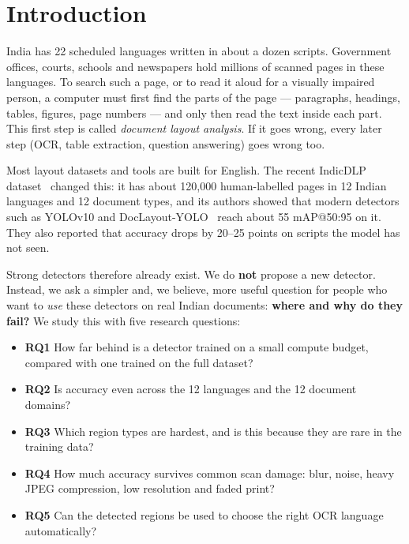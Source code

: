 \section{Introduction}
India has 22 scheduled languages written in about a dozen scripts. Government offices, courts, schools and
newspapers hold millions of scanned pages in these languages. To search such a page, or to read it aloud for a
visually impaired person, a computer must first find the parts of the page --- paragraphs, headings, tables,
figures, page numbers --- and only then read the text inside each part. This first step is called
\emph{document layout analysis}. If it goes wrong, every later step (OCR, table extraction, question answering)
goes wrong too.

Most layout datasets and tools are built for English. The recent IndicDLP dataset~\cite{indicdlp} changed this: it
has about 120{,}000 human-labelled pages in 12 Indian languages and 12 document types, and its authors showed that
modern detectors such as YOLOv10 and DocLayout-YOLO~\cite{doclayout} reach about 55 mAP@50:95 on it. They also
reported that accuracy drops by 20--25 points on scripts the model has not seen.

Strong detectors therefore already exist. We do \textbf{not} propose a new detector. Instead, we ask a simpler
and, we believe, more useful question for people who want to \emph{use} these detectors on real Indian documents:
\textbf{where and why do they fail?} We study this with five research questions:
\begin{itemize}
\item \textbf{RQ1} How far behind is a detector trained on a small compute budget, compared with one trained on the full dataset?
\item \textbf{RQ2} Is accuracy even across the 12 languages and the 12 document domains?
\item \textbf{RQ3} Which region types are hardest, and is this because they are rare in the training data?
\item \textbf{RQ4} How much accuracy survives common scan damage: blur, noise, heavy JPEG compression, low resolution and faded print?
\item \textbf{RQ5} Can the detected regions be used to choose the right OCR language automatically?
\end{itemize}

